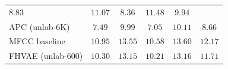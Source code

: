 \documentclass[transmag]{IEEEtran}
\begin{document}
\begin{table}[!t]
{\begin{tabular}{l|cccc|c}
$8.83$&$11.07$&$8.36$&$11.48$&$9.94$\\
APC (unlab-6K)   & $7.49$&$9.99$&$7.05$&$10.11$&$\bm{8.66}$\\
\midrule
MFCC baseline \cite{kahn2019librilight}  & $10.95$&$13.55$&$10.58$&$13.60$&$12.17$\\
FHVAE (unlab-600) &$10.30$&$13.15$&$10.21$&$13.16$&$11.71$\\
\midrule[0.2pt]
\bottomrule
\end{tabular}%

}
\label{tab:exp_results_apc_paras}
\end{table}
\end{document}
